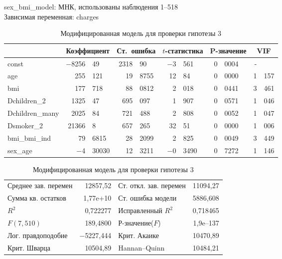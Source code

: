 \documentclass[a4paper,12pt]{article}
\begin{document}
\begin{table}[H]
	\begin{center}
		sex\_bmi\_model:
		МНК, использованы наблюдения 1--518\\
		Зависимая переменная: charges\\
		\vspace{1em}
		\begin{tabular}{|l|r@{,}l|r@{,}l|r@{,}l|r@{,}l|r@{,}l|}
			\hline
			&
			\multicolumn{2}{c|}{Коэффициент} &
			\multicolumn{2}{c|}{Ст.\ ошибка} &
			\multicolumn{2}{c|}{$t$-статистика} &
			\multicolumn{2}{c|}{P-значение} &
			\multicolumn{2}{c|}{VIF} \\[1ex]
			\hline
			const &	$-$8256&49 & 2318&90 & $-$3&561 & 0&0004 & -& \\
			\hline
			age & 255&121 & 19&8755 & 12&84 & 0&0000 & 1&157 \\
			\hline
			bmi & 177&718 &	88&0812 & 2&018 & 0&0441 & 3&461 \\
			\hline
			Dchildren\_2 & 1325&47 & 695&097 & 1&907 & 0&0571 & 1&046 \\
			\hline
			Dchildren\_many & 2025&84 &	721&488 & 2&808 & 0&0052 & 1&047\\
			\hline
			Dsmoker\_2 & 21366&8 & 657&265 & 32&51 & 0&0000 & 1&006 \\
			\hline
			bmi\_bmi\_ind & 79&6815 & 28&2099 &	2&825 &	0&0049 & 3&449 \\
			\hline
			sex\_age & $-$4&30030 &	12&3211 & $-$0&3490 & 0&7272 & 1&146 \\
			\hline
		\end{tabular}
		\vspace{1ex}
		\begin{tabular}{lrlr}
			Среднее зав. перемен &  12857,52 & Ст. откл. зав. перемен &  11094,27 \\
			Сумма кв. остатков &  1,77\textrm{e+10} & Ст. ошибка модели &  5886,608 \\
			$R^2$ &  0,722277 & Исправленный $R^2$ &  0,718465 \\
			$F(7, 510)$ &  189,4800 & Р-значение($F$) &  1,9\textrm{e--137} \\
			Лог. правдоподобие & $-$5227,444 & Крит. Акаике &  10470,89 \\
			Крит. Шварца &  10504,89 & Hannan--Quinn &  10484,21 \\
		\end{tabular}
	\end{center}
	\caption{Модифицированная модель для проверки гипотезы 3}
	\label{tab:sex-bmi-model}
\end{table}
\end{document}
